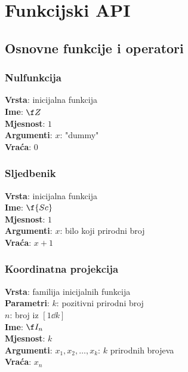 \setlength{\parindent}{0pt}

\chapter{Funkcijski API}

\section{Osnovne funkcije i operatori}

\subsection{Nulfunkcija}
\textbf{Vrsta}: inicijalna funkcija\\
\textbf{Ime}: $\f Z$\\
\textbf{Mjesnost}: $1$\\
\textbf{Argumenti}: $x$: "dummy"\\
\textbf{Vraća}: $0$

\subsection{Sljedbenik}
\textbf{Vrsta}: inicijalna funkcija\\
\textbf{Ime}: $\f{Sc}$\\
\textbf{Mjesnost}: $1$\\
\textbf{Argumenti}: $x$: bilo koji prirodni broj\\
\textbf{Vraća}: $x+1$

\subsection{Koordinatna projekcija}
\textbf{Vrsta}: familija inicijalnih funkcija\\
\textbf{Parametri}: $k$: pozitivni prirodni broj\\
$n$: broj iz $[1\dd k]$\\
\textbf{Ime}: $\f I_n$\\
\textbf{Mjesnost}: $k$\\
\textbf{Argumenti}: $x_1,x_2,\dots,x_k$: $k$ prirodnih brojeva\\
\textbf{Vraća}: $x_n$

